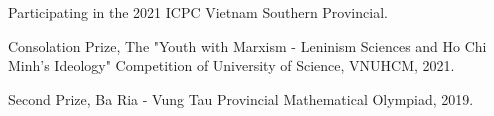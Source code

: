 \documentclass[11pt]{spidercv}
\begin{document}
\begin{MainPart}
    \vspace*{0.5cm}
        \begin{ItemList}{\ColorHighlight}
            \item [] Participating in the 2021 ICPC Vietnam Southern Provincial.
            \item [] Consolation Prize, The "Youth with Marxism - Leninism Sciences and Ho Chi Minh's Ideology" Competition of University of Science, VNUHCM, 2021.
            \item [] Second Prize, Ba Ria - Vung Tau Provincial Mathematical Olympiad, 2019.
        \end{ItemList}
        

    \end{MainPart}

    
\end{document}
